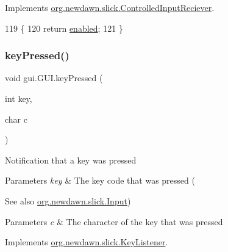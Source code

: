Implements \mbox{\hyperlink{interfaceorg_1_1newdawn_1_1slick_1_1_controlled_input_reciever_a380186fb0c34c11c212b72fae8186dc7}{org.\+newdawn.\+slick.\+Controlled\+Input\+Reciever}}.


\begin{DoxyCode}
119                                       \{
120         \textcolor{keywordflow}{return} \mbox{\hyperlink{classgui_1_1_g_u_i_ac666fbd257937cf3560d48acafe419ce}{enabled}};
121     \}
\end{DoxyCode}
\mbox{\label{classgui_1_1_g_u_i_a0e860c8c9836a67afdb56ef5fd45d220}} 
\subsubsection{\texorpdfstring{key\+Pressed()}{keyPressed()}}
{\footnotesize\ttfamily void gui.\+G\+U\+I.\+key\+Pressed (\begin{DoxyParamCaption}\item[{int}]{key,  }\item[{char}]{c }\end{DoxyParamCaption})\hspace{0.3cm}{\ttfamily [inline]}}

Notification that a key was pressed


\begin{DoxyParams}{Parameters}
{\em key} & The key code that was pressed (\\
\hline
\end{DoxyParams}
\begin{DoxySeeAlso}{See also}
\mbox{\hyperlink{classorg_1_1newdawn_1_1slick_1_1_input}{org.\+newdawn.\+slick.\+Input}}) 
\end{DoxySeeAlso}

\begin{DoxyParams}{Parameters}
{\em c} & The character of the key that was pressed \\
\hline
\end{DoxyParams}


Implements \mbox{\hyperlink{interfaceorg_1_1newdawn_1_1slick_1_1_key_listener_ac0b0568a21ef486c4f51382614c196ef}{org.\+newdawn.\+slick.\+Key\+Listener}}.


